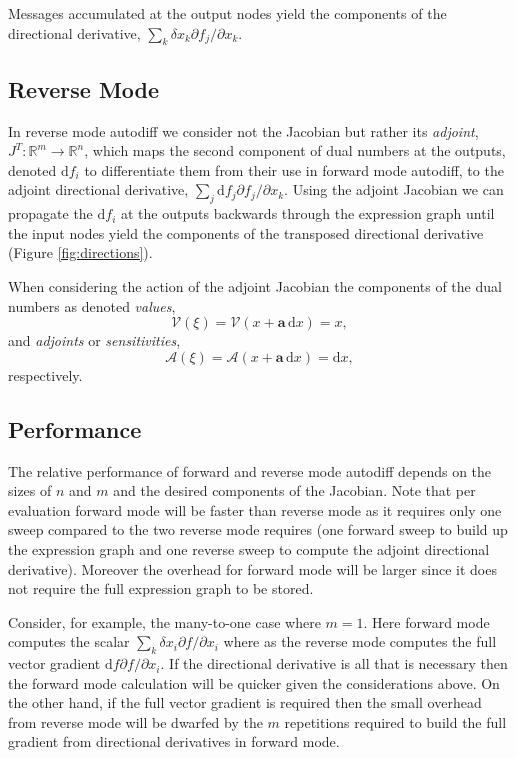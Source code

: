 \documentclass[11pt]{article}
\begin{document}
Messages accumulated at the output nodes yield the components of the directional
derivative, $\sum_{k} \delta x_{k} \partial f_{j} / \partial x_{k}$.

\subsection*{Reverse Mode}

In reverse mode autodiff we consider not the Jacobian but rather its \textit{adjoint},
$J^{T} : \mathbb{R}^{m} \rightarrow \mathbb{R}^{n}$, which maps the second
component of dual numbers at the outputs, denoted $\mathrm{d} f_{i}$ to differentiate
them from their use in forward mode autodiff, to the adjoint directional derivative, 
$\sum_{j} \mathrm{d} f_{j} \partial f_{j} / \partial x_{k}$.  Using the adjoint Jacobian
we can propagate the $\mathrm{d} f_{i}$ at the outputs backwards through the 
expression graph until the input nodes yield the components of the transposed
directional derivative (Figure \ref{fig:directions}).

When considering the action of the adjoint Jacobian the components of the dual
numbers as denoted \textit{values},
%
\begin{equation*}
\mathcal{V} \! \left( \xi \right) 
= \mathcal{V} \! \left( x + \mathbf{a} \, \mathrm{d} x \right) 
= x,
\end{equation*}
%
and \textit{adjoints} or \textit{sensitivities},
\begin{equation*}
\mathcal{A} \! \left( \xi \right) 
= \mathcal{A} \! \left( x + \mathbf{a} \, \mathrm{d} x \right) 
= \mathrm{d} x,
\end{equation*}
%
respectively.

\subsection*{Performance}

The relative performance of forward and reverse mode autodiff depends on
the sizes of $n$ and $m$ and the desired components of the Jacobian.  Note
that per evaluation forward mode will be faster than reverse mode as it requires
only one sweep compared to the two reverse mode requires (one forward sweep
to build up the expression graph and one reverse sweep to compute the adjoint
directional derivative).  Moreover the overhead for forward mode will be larger
since it does not require the full expression graph to be stored.

Consider, for example, the many-to-one case where $m = 1$.  Here forward
mode computes the scalar $\sum_{k} \delta x_{i} \partial f / \partial x_{i}$
where as the reverse mode computes the full vector gradient 
$\mathrm{d} f \partial f / \partial x_{i}$.  If the directional derivative is all
that is necessary then the forward mode calculation will be quicker given
the considerations above.  On the other hand, if the full vector gradient is required 
then the small overhead from reverse mode will be dwarfed by the $m$ repetitions 
required to build the full gradient from directional derivatives in forward mode.
\end{document}

